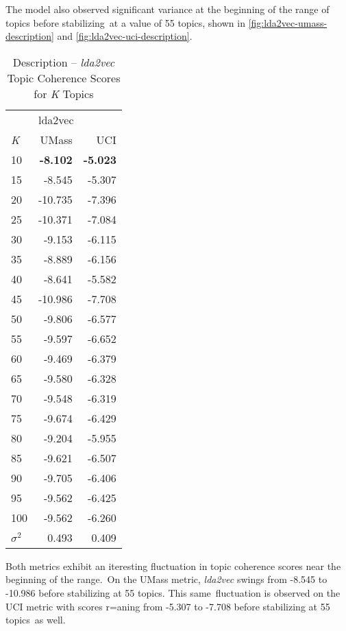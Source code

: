 \documentclass[letterpaper,12pt]{article}
\begin{document}
The model also observed significant variance at the beginning of the range of topics before stabilizing\
at a value of 55 topics, shown in \ref{fig:lda2vec-umass-description} and \ref{fig:lda2vec-uci-description}.
\begin{table}
	\caption{\label{tab:lda2vec_description_tc} Description -- \emph{lda2vec} Topic Coherence Scores for \emph{K} Topics}
	\begin{center}
		\begin{tabular}{lrr}
			\toprule
				{} & \multicolumn{2}{l}{lda2vec} \\
				\emph{K} &   UMass &    UCI \\
				\midrule
				10  &  \textbf{-8.102} & \textbf{-5.023} \\
				15  &  -8.545 & -5.307 \\
				20  & -10.735 & -7.396 \\
				25  & -10.371 & -7.084 \\
				30  &  -9.153 & -6.115 \\
				35  &  -8.889 & -6.156 \\
				40  &  -8.641 & -5.582 \\
				45  & -10.986 & -7.708 \\
				50  &  -9.806 & -6.577 \\
				55  &  -9.597 & -6.652 \\
				60  &  -9.469 & -6.379 \\
				65  &  -9.580 & -6.328 \\
				70  &  -9.548 & -6.319 \\
				75  &  -9.674 & -6.429 \\
				80  &  -9.204 & -5.955 \\
				85  &  -9.621 & -6.507 \\
				90  &  -9.705 & -6.406 \\
				95  &  -9.562 & -6.425 \\
				100 &  -9.562 & -6.260 \\
			\midrule
			$\sigma^2$ & 0.493 & 0.409 \\
			\bottomrule
		\end{tabular}
	\end{center}
\end{table}

Both metrics exhibit an iteresting fluctuation in topic coherence scores near the beginning of the range.\
On the UMass metric, \emph{lda2vec} swings from -8.545 to -10.986 before stabilizing at 55 topics. This same\
fluctuation is observed on the UCI metric with scores r=aning from -5.307 to -7.708 before stabilizing at 55 topics\
as well.
\end{document}
